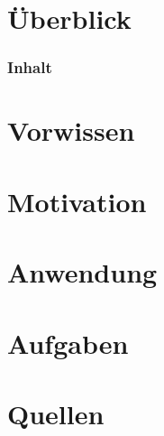 \documentclass[]{beamer}
\begin{document}

\section*{Überblick}
\begin{frame}
    \frametitle{Inhalt}
    \tableofcontents
\end{frame}


\section{Vorwissen}



\section{Motivation}




\section{Anwendung}



% 

\section{Aufgaben}


\section*{Quellen}

\end{document}
